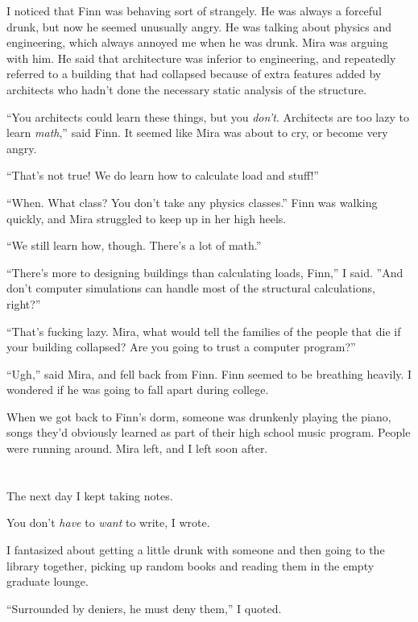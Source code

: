 I noticed that Finn was behaving sort of strangely.  He was always a forceful
drunk, but now he seemed unusually angry.  He was talking about physics and
engineering, which always annoyed me when he was drunk.  Mira was arguing with
him.  He said that architecture was inferior to engineering, and repeatedly
referred to a building that had collapsed because of extra features added by
architects who hadn't done the necessary static analysis of the structure.

``You architects could learn these things, but you \textit{don't}.  Architects
are too lazy to learn \textit{math},'' said Finn.  It seemed like Mira was
about to cry, or become very angry.

``That's not true!  We do learn how to calculate load and stuff!''

``When.  What class?  You don't take any physics classes.''  Finn was walking
quickly, and Mira struggled to keep up in her high heels.

``We still learn how, though.  There's a lot of math.''

``There's more to designing buildings than calculating loads, Finn,'' I said.
''And don't computer simulations can handle most of the structural calculations,
right?''

``That's fucking lazy.  Mira, what would tell the families of the people that
die if your building collapsed?  Are you going to trust a computer program?'' 

``Ugh,'' said Mira, and fell back from Finn.  Finn seemed to be breathing
heavily.  I wondered if he was going to fall apart during college.  

When we got back to Finn's dorm, someone was drunkenly playing the piano, songs
they'd obviously learned as part of their high school music program.  People
were running around.  Mira left, and I left soon after.  

\section{}

The next day I kept taking notes.

You don't \textit{have} to \textit{want} to write, I wrote.

I fantasized about getting a little drunk with someone and then going to the
library together, picking up random books and reading them in the empty graduate
lounge.

``Surrounded by deniers, he must deny them,'' I quoted.


